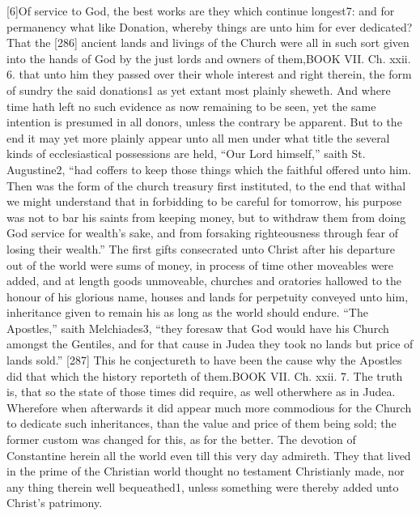 [6]Of service to God, the best works are they which continue longest7: and for permanency what like Donation, whereby things are unto him for ever dedicated? That the [286] ancient lands and livings of the Church were all in such sort given into the hands of God by the just lords and owners of them,BOOK VII. Ch. xxii. 6. that unto him they passed over their whole interest and right therein, the form of sundry the said donations1 as yet extant most plainly sheweth. And where time hath left no such evidence as now remaining to be seen, yet the same intention is presumed in all donors, unless the contrary be apparent. But to the end it may yet more plainly appear unto all men under what title the several kinds of ecclesiastical possessions are held, “Our Lord himself,” saith St. Augustine2, “had coffers to keep those things which the faithful offered unto him. Then was the form of the church treasury first instituted, to the end that withal we might understand that in forbidding to be careful for tomorrow, his purpose was not to bar his saints from keeping money, but to withdraw them from doing God service for wealth’s sake, and from forsaking righteousness through fear of losing their wealth.” The first gifts consecrated unto Christ after his departure out of the world were sums of money, in process of time other moveables were added, and at length goods unmoveable, churches and oratories hallowed to the honour of his glorious name, houses and lands for perpetuity conveyed unto him, inheritance given to remain his as long as the world should endure. “The Apostles,” saith Melchiades3, “they foresaw that God would have his Church amongst the Gentiles, and for that cause in Judea they took no lands but price of lands sold.” [287] This he conjectureth to have been the cause why the Apostles did that which the history reporteth of them.BOOK VII. Ch. xxii. 7. The truth is, that so the state of those times did require, as well otherwhere as in Judea. Wherefore when afterwards it did appear much more commodious for the Church to dedicate such inheritances, than the value and price of them being sold; the former custom was changed for this, as for the better. The devotion of Constantine herein all the world even till this very day admireth. They that lived in the prime of the Christian world thought no testament Christianly made, nor any thing therein well bequeathed1, unless something were thereby added unto Christ’s patrimony.

